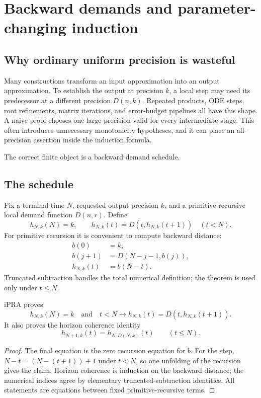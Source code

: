 \section{Backward demands and parameter-changing induction}
\label{sec:demand}

\subsection{Why ordinary uniform precision is wasteful}

Many constructions transform an input approximation into an output
approximation.  To establish the output at precision \(k\), a local step may
need its predecessor at a different precision \(D(n,k)\).  Repeated products,
ODE steps, root refinements, matrix iterations, and error-budget pipelines all
have this shape.  A naive proof chooses one large precision valid for every
intermediate stage.  This often introduces unnecessary monotonicity hypotheses,
and it can place an all-precision assertion inside the induction formula.

The correct finite object is a backward demand schedule.

\subsection{The schedule}

Fix a terminal time \(N\), requested output precision \(k\), and a
primitive-recursive local demand function \(D(n,r)\).  Define
\[
 h_{N,k}(N)=k,
 \qquad
 h_{N,k}(t)=D(t,h_{N,k}(t+1))\quad(t<N).
\]
For primitive recursion it is convenient to compute backward distance:
\begin{align*}
 b(0)&=k,\\
 b(j+1)&=D(N-j-1,b(j)),\\
 h_{N,k}(t)&=b(N-t).
\end{align*}
Truncated subtraction handles the total numerical definition; the theorem is
used only under \(t\le N\).

\begin{lemma}
\label{lem:demand-equations}
iPRA proves
\[
 h_{N,k}(N)=k
 \quad\text{and}\quad
 t<N\to h_{N,k}(t)=D(t,h_{N,k}(t+1)).
\]
It also proves the horizon coherence identity
\[
 h_{N+1,k}(t)=h_{N,D(N,k)}(t)\qquad(t\le N).
\]
\end{lemma}

\begin{proof}
The final equation is the zero recursion equation for \(b\).  For the step,
\(N-t=(N-(t+1))+1\) under \(t<N\), so one unfolding of the recursion gives the
claim.  Horizon coherence is induction on the backward distance; the numerical
indices agree by elementary truncated-subtraction identities.  All statements
are equations between fixed primitive-recursive terms.
\end{proof}

